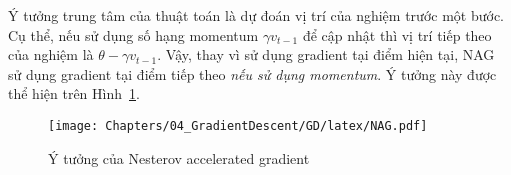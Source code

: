 
Ý tưởng trung tâm của thuật toán là {dự đoán vị trí của nghiệm trước một bước}.
Cụ thể, nếu sử dụng số hạng {momentum} $\gamma v_{t-1}$ để cập nhật thì vị trí
tiếp theo của nghiệm là $\theta - \gamma v_{t-1}$. Vậy, thay vì sử dụng gradient
tại điểm hiện tại, NAG sử dụng gradient tại điểm tiếp theo \textit{nếu sử dụng
momentum}. Ý tưởng này được thể hiện trên Hình~\ref{fig:8_mynag}.

\begin{figure}[t]
\centering
\texttt{[image: Chapters/04\_GradientDescent/GD/latex/NAG.pdf]}
\caption[]{Ý tưởng của Nesterov accelerated gradient}
\label{fig:8_mynag}
\end{figure}




